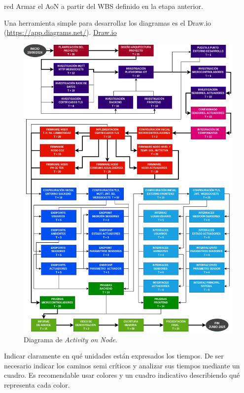 \begin{consigna}{red}
	Armar el AoN a partir del WBS definido en la etapa anterior.

	Una herramienta simple para desarrollar los diagramas es el Draw.io
	(\url{https://app.diagrams.net/}). \href{https://app.diagrams.net}{Draw.io}

	\begin{figure}[htpb]
		\centering
		\includegraphics[width=.8\textwidth]{./Figuras/AoN.png}
		\caption{Diagrama de \textit{Activity on Node}.}
		\label{fig:AoN}
	\end{figure}

	Indicar claramente en qué unidades están expresados los tiempos. De ser
	necesario indicar los caminos semi críticos y analizar sus tiempos mediante un
	cuadro. Es recomendable usar colores y un cuadro indicativo describiendo qué
	representa cada color.

\end{consigna}